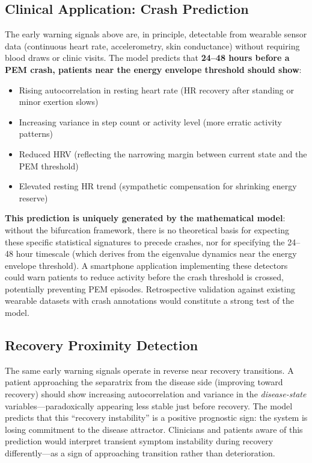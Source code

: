 \subsection{Clinical Application: Crash Prediction}

The early warning signals above are, in principle, detectable from wearable sensor data (continuous heart rate, accelerometry, skin conductance) without requiring blood draws or clinic visits. The model predicts that \textbf{24--48 hours before a PEM crash, patients near the energy envelope threshold should show}:

\begin{itemize}
    \item Rising autocorrelation in resting heart rate (HR recovery after standing or minor exertion slows)
    \item Increasing variance in step count or activity level (more erratic activity patterns)
    \item Reduced HRV (reflecting the narrowing margin between current state and the PEM threshold)
    \item Elevated resting HR trend (sympathetic compensation for shrinking energy reserve)
\end{itemize}

\textbf{This prediction is uniquely generated by the mathematical model}: without the bifurcation framework, there is no theoretical basis for expecting these specific statistical signatures to precede crashes, nor for specifying the 24--48 hour timescale (which derives from the eigenvalue dynamics near the energy envelope threshold). A smartphone application implementing these detectors could warn patients to reduce activity before the crash threshold is crossed, potentially preventing PEM episodes. Retrospective validation against existing wearable datasets with crash annotations would constitute a strong test of the model.

\subsection{Recovery Proximity Detection}

The same early warning signals operate in reverse near recovery transitions. A patient approaching the separatrix from the disease side (improving toward recovery) should show increasing autocorrelation and variance in the \emph{disease-state} variables---paradoxically appearing less stable just before recovery. The model predicts that this ``recovery instability'' is a positive prognostic sign: the system is losing commitment to the disease attractor. Clinicians and patients aware of this prediction would interpret transient symptom instability during recovery differently---as a sign of approaching transition rather than deterioration.

